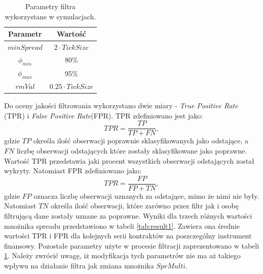 \documentclass[a4paper,12pt,openany, DIV=calc, headsepline]{scrbook}
\begin{document}
\begin{table}
\centering

\begin{tabular}{|c|c|}
\hline
Parametr & Wartość \\
\hline
$minSpread$ & $2 \cdot TickSize$ \\
$\phi_{min}$ & 80\% \\
$\phi_{max}$ & 95\% \\
$rmVal$ & $0.25 \cdot TickSize$\\
\hline
\end{tabular}
\caption{Parametry filtra wykorzystane w symulacjach.}
\label{params2}
\end{table}

Do oceny jakości filtrowania wykorzystano dwie miary - \emph{True Positive  Rate} (TPR) i \emph{False Positive Rate}(FPR). TPR zdefiniowano jest jako:
\begin{equation}
TPR = \frac{TP}{TP + FN},
\end{equation}
gdzie $TP$ określa ilość obserwacji poprawnie sklasyfikowanych jako odstające, a $FN$ liczbę obserwacji odstających które zostały sklasyfikowane jako poprawne. Wartość TPR przedstawia jaki procent wszystkich obserwacji odstających został wykryty. Natomiast FPR zdefiniowano jako:
\begin{equation}
TPR = \frac{FP}{FP + TN},
\end{equation}
gdzie $FP$ oznacza liczbę obserwacji uznanych za odstające, mimo że nimi nie były. Natomiast $TN$ określa ilość obserwacji, które zarówno przez filtr jak i osobę filtrującą dane zostały uznane za poprawne. Wyniki dla trzech różnych wartości mnożnika spreadu przedstawiono w tabeli \ref{tab:result1}. Zawiera ona średnie wartości TPR i FPR dla kolejnych serii kontraktów na poszczególny instrument finansowy. Pozostałe parametry użyte w procesie filtracji zaprezentowano w tabeli \ref{params2}. Należy zwrócić uwagę, iż modyfikacja tych parametrów nie ma aż takiego wpływu na działanie filtra jak zmiana mnożnika $SprMulti$.
\end{document}
